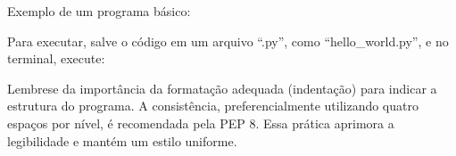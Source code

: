 \documentclass[letterpaper,10pt,english]{jupyterBook}
\begin{document}
\sphinxAtStartPar
Exemplo de um programa básico:

\begin{sphinxVerbatim}[commandchars=\\\{\}]
 

   
\end{sphinxVerbatim}

\sphinxAtStartPar
Para executar, salve o código em um arquivo “.py”, como “hello\_world.py”, e no terminal, execute:

\begin{sphinxVerbatim}[commandchars=\\\{\}]
 
\end{sphinxVerbatim}

\sphinxAtStartPar
Lembre\sphinxhyphen{}se da importância da formatação adequada (indentação) para indicar a estrutura do programa. A consistência, preferencialmente utilizando quatro espaços por nível, é recomendada pela PEP 8. Essa prática aprimora a legibilidade e mantém um estilo uniforme.
\end{document}
